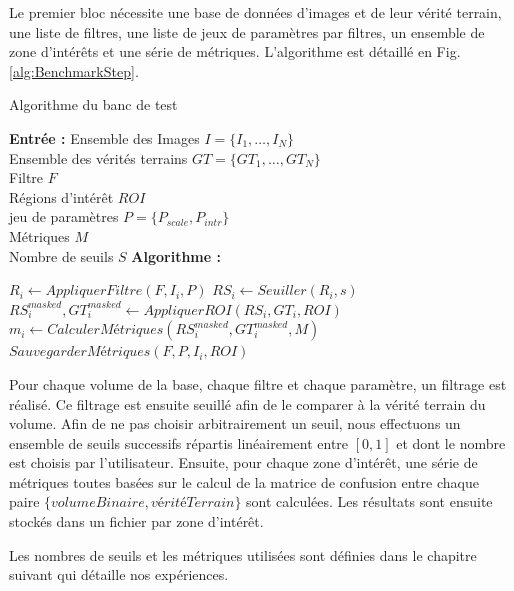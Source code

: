 Le premier bloc nécessite une base de données d'images et de leur vérité terrain, une liste de filtres, une liste de jeux de paramètres par filtres, un ensemble de zone d'intérêts et une série de métriques. L'algorithme est détaillé en Fig. \ref{alg:BenchmarkStep}.

\begin{algorithm}[!ht]
  \caption{Algorithme du banc de test}\label{alg:BenchmarkStep}
      \textbf{Entrée :}
      Ensemble des Images $I=\{I_1,\ldots,I_N\}$ \\
      Ensemble des vérités terrains $GT=\{GT_1,\ldots,GT_N\}$\\
      Filtre $F$\\
      Régions d'intérêt $ROI$\\
      jeu de paramètres  $P=\{ P_{scale},P_{intr} \} $\\ 
      Métriques $M$\\
      Nombre de seuils $S$
      \textbf{Algorithme :}
      \begin{algorithmic}
              \State $R_{i} \gets AppliquerFiltre(F,I_i,P)$
                \State $RS_{i} \gets Seuiller(R_{i},s)$
                \State $RS_{i}^{masked},GT_{i}^{masked} \gets AppliquerROI( RS_{i},GT_{i}, ROI ) $
                \State $m_{i} \gets CalculerMétriques(RS_{i}^{masked}, GT_{i}^{masked}, M)$
                \State $SauvegarderMétriques(F,P,I_i,ROI)$
              \EndFor
          \EndFor
      \end{algorithmic}
  \end{algorithm}

Pour chaque volume de la base, chaque filtre et chaque paramètre, un filtrage est réalisé. Ce filtrage est ensuite seuillé afin de le comparer à la vérité terrain du volume. Afin de ne pas choisir arbitrairement un seuil, nous effectuons un ensemble de seuils successifs répartis linéairement entre $[0,1]$ et dont le nombre est choisis par l'utilisateur. Ensuite, pour chaque zone d'intérêt, une série de métriques toutes basées sur le calcul de la matrice de confusion entre chaque paire $\{volume Binaire, vérité Terrain\}$ sont calculées. Les résultats sont ensuite stockés dans un fichier par zone d'intérêt.

Les nombres de seuils et les métriques utilisées sont définies dans le chapitre suivant qui détaille nos expériences. 

